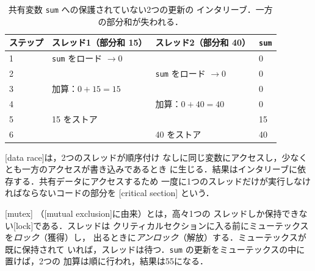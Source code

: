 \documentclass[../main.tex]{subfiles}
\begin{document}
\begin{table}[tb]
  \centering
  \small
  \caption{共有変数 \texttt{sum} への保護されていない2つの更新の
    インタリーブ．一方の部分和が失われる．}
  \label{tab:l02-race}
  \begin{tabular}{llll}
    \toprule
    ステップ & スレッド1（部分和 15） & スレッド2（部分和 40） & \texttt{sum} \\
    \midrule
    1 & \texttt{sum} をロード $\to 0$ &                               & 0 \\
    2 &                               & \texttt{sum} をロード $\to 0$ & 0 \\
    3 & 加算：$0+15=15$               &                               & 0 \\
    4 &                               & 加算：$0+40=40$               & 0 \\
    5 & 15 をストア                   &                               & 15 \\
    6 &                               & 40 をストア                   & 40 \\
    \bottomrule
  \end{tabular}
\end{table}

\begin{definition}
  [data race]は，2つのスレッドが順序付け
  なしに同じ変数にアクセスし，少なくとも一方のアクセスが書き込みであるとき
  に生じる．結果はインタリーブに依存する．共有データにアクセスするため
  一度に1つのスレッドだけが実行しなければならないコードの部分を
  [critical section]
  という．
\end{definition}


\begin{definition}[ミューテックス]
  [mutex]
  （[mutual exclusion]に由来）とは，高々1つの
  スレッドしか保持できない[lock]である．スレッドは
  クリティカルセクションに入る前にミューテックスを\emph{ロック}（獲得）し，
  出るときに\emph{アンロック}（解放）する．ミューテックスが既に保持されて
  いれば，スレッドは待つ．\texttt{sum} の更新をミューテックスの中に置けば，2つの
  加算は順に行われ，結果は55になる．
\end{definition}
\end{document}
